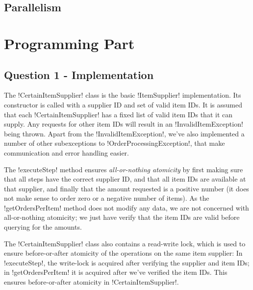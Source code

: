 \documentclass[a4paper, 12pt]{article}
\begin{document}
\subsection*{Parallelism}

\section*{Programming Part}

\subsection*{Question 1 - Implementation}




The !CertainItemSupplier! class is the basic !ItemSupplier!
implementation. Its constructor is called with a supplier ID and set
of valid item IDs. It is assumed that each !CertainItemSupplier! has a
fixed list of valid item IDs that it can supply. Any requests for
other item IDs will result in an !InvalidItemException! being
thrown. Apart from the !InvalidItemException!, we've also implemented
a number of other subexceptions to !OrderProcessingException!, that
make communication and error handling easier.

The !executeStep! method ensures \emph{all-or-nothing atomicity} by
first making sure that all steps have the correct supplier ID, and
that all item IDs are available at that supplier, and finally that the
amount requested is a positive number (it does not make sense to order
zero or a negative number of items). As the !getOrdersPerItem! method
does not modify any data, we are not concerned with all-or-nothing
atomicity; we just have verify that the item IDs are valid before
querying for the amounts.

The !CertainItemSupplier! class also contains a read-write lock, which
is used to ensure before-or-after atomicity of the operations on the
same item supplier: In !executeStep!, the write-lock is acquired after
verifying the supplier and item IDs; in !getOrdersPerItem! it is
acquired after we've verified the item IDs. This ensures
before-or-after atomicity in !CertainItemSupplier!.
\end{document}
